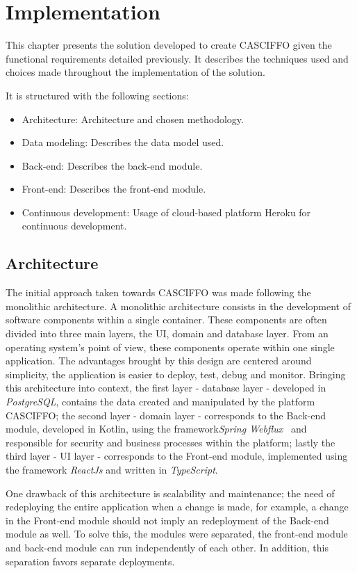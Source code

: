 \setlength{\headheight}{14.49998pt}
\chapter{Implementation}\label{ch:implementation}

This chapter presents the solution developed to create CASCIFFO given the functional requirements detailed previously. It describes the techniques used and choices made throughout the implementation of the solution.

It is structured with the following sections:
\begin{itemize}
    \item Architecture: Architecture and chosen methodology.
    \item Data modeling: Describes the data model used. 
    \item Back-end: Describes the back-end module.
    \item Front-end: Describes the front-end module.
    \item Continuous development: Usage of cloud-based platform Heroku for continuous development.
\end{itemize}

\section{Architecture}
The initial approach taken towards CASCIFFO was made following the monolithic architecture. A monolithic architecture consists in the development of software components within a single container. These components are often divided into three main layers, the UI, domain and database layer. From an operating system's point of view, these components operate within one single application. The advantages brought by this design are centered around simplicity, the application is easier to deploy, test, debug and monitor. 
Bringing this architecture into context, the first layer - database layer - developed in \textit{PostgreSQL}, contains the data created and manipulated by the platform CASCIFFO; the second layer - domain layer - corresponds to the Back-end module, developed in Kotlin, using the framework\textit{Spring Webflux}~\cite{spring-webflux} and responsible for security and business processes within the platform; lastly the third layer - UI layer - corresponds to the Front-end module, implemented using the framework \textit{ReactJs} and written in \textit{TypeScript}.

One drawback of this architecture is scalability and maintenance; the need of redeploying the entire application when a change is made, for example, a change in the Front-end module should not imply an redeployment of the Back-end module as well. To solve this, the modules were separated, the front-end module and back-end module can run independently of each other. In addition, this separation favors separate deployments.


